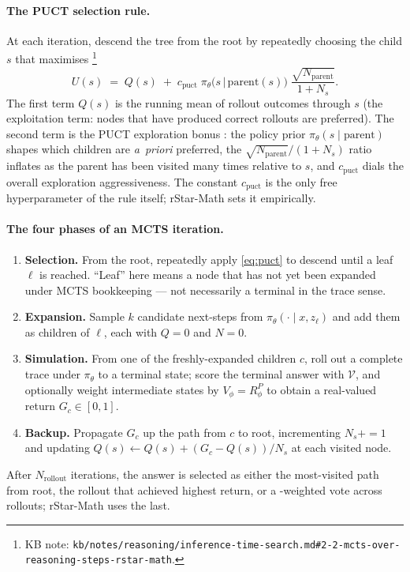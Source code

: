 \paragraph{The PUCT selection rule.} At each iteration, descend the tree
from the root by repeatedly choosing the child $s$ that maximises%
\footnote{KB note:
\nolinkurl{kb/notes/reasoning/inference-time-search.md#2-2-mcts-over-reasoning-steps-rstar-math}.}
\begin{equation}
  U(s) \;=\; Q(s) \;+\; c_\text{puct}\;
              \pi_\theta\!\bigl(s \,\big|\, \text{parent}(s)\bigr)\;
              \frac{\sqrt{N_\text{parent}}}{1 + N_s}.
  \label{eq:puct}
\end{equation}
The first term $Q(s)$ is the running mean of rollout outcomes through
$s$ (the exploitation term: nodes that have produced correct rollouts
are preferred). The second term is the PUCT exploration bonus
\citep{rstar-math2025}: the policy prior
$\pi_\theta(s \mid \text{parent})$ shapes which children are
\emph{a~priori} preferred, the
$\sqrt{N_\text{parent}}/(1 + N_s)$ ratio inflates as the parent has
been visited many times relative to $s$, and $c_\text{puct}$ dials the
overall exploration aggressiveness. The constant $c_\text{puct}$ is
the only free hyperparameter of the rule itself; rStar-Math sets it
empirically.

\paragraph{The four phases of an MCTS iteration.}
\begin{enumerate}
\item \textbf{Selection.} From the root, repeatedly apply
\cref{eq:puct} to descend until a leaf $\ell$ is reached. ``Leaf'' here
means a node that has not yet been expanded under MCTS bookkeeping ---
not necessarily a terminal in the trace sense.
\item \textbf{Expansion.} Sample $k$ candidate next-steps from
$\pi_\theta(\cdot \mid x, z_{\ell})$ and add them as children of
$\ell$, each with $Q = 0$ and $N = 0$.
\item \textbf{Simulation.} From one of the freshly-expanded children
$c$, roll out a complete trace under $\pi_\theta$ to a terminal state;
score the terminal answer with $\mathcal{V}$, and optionally weight
intermediate states by $V_\phi = R^P_\phi$ to obtain a real-valued
return $G_c \in [0, 1]$.
\item \textbf{Backup.} Propagate $G_c$ up the path from $c$ to root,
incrementing $N_s \mathrel{{+}{=}} 1$ and updating
$Q(s) \mathrel{{\leftarrow}} Q(s) + (G_c - Q(s))/N_s$ at each visited
node.
\end{enumerate}
After $N_\text{rollout}$ iterations, the answer is selected as either
the most-visited path from root, the rollout that achieved highest
return, or a -weighted vote across rollouts; rStar-Math uses the
last.

